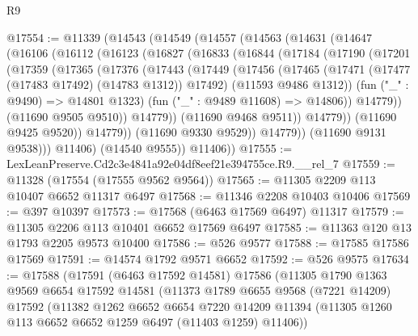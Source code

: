 \begin{lexlean}{R9}
\begin{coremodule}
@17554 := @11339
    (@14543
      (@14549
        (@14557
          (@14563
            (@14631
              (@14647
                (@16106
                  (@16112
                    (@16123
                      (@16827
                        (@16833
                          (@16844
                            (@17184
                              (@17190
                                (@17201
                                  (@17359
                                    (@17365
                                      (@17376
                                        (@17443
                                          (@17449
                                            (@17456
                                              (@17465
                                                (@17471
                                                  (@17477 (@17483 @17492) (@14783 @1312))
                                                  @17492)
                                                (@11593 @9486 @1312))
                                              (fun ("_" : @9490) => @14801 @1323)
                                              (fun ("_" : @9489 @11608) => @14806))
                                            @14779))
                                        (@11690 @9505 @9510))
                                      @14779))
                                  (@11690 @9468 @9511))
                                @14779))
                            (@11690 @9425 @9520))
                          @14779))
                      (@11690 @9330 @9529))
                    @14779))
                (@11690 @9131 @9538)))
            @11406)
          (@14540 @9555))
        @11406))
@17555 := LexLeanPreserve.Cd2c3e4841a92e04df8eef21e394755ce.R9.__rel_7
@17559 := @11328 (@17554 (@17555 @9562 @9564))
@17565 := @11305 @2209 @113 @10407 @6652 @11317 @6497
@17568 := @11346 @2208 @10403 @10406
@17569 := @397 @10397
@17573 := @17568 (@6463 @17569 @6497) @11317
@17579 := @11305 @2206 @113 @10401 @6652 @17569 @6497
@17585 := @11363 @120 @13 @1793 @2205 @9573 @10400
@17586 := @526 @9577
@17588 := @17585 @17586 @17569
@17591 := @14574 @1792 @9571 @6652
@17592 := @526 @9575
@17634 := @17588
    (@17591
      (@6463 @17592 @14581)
      @17586
      (@11305
        @1790
        @1363
        @9569
        @6654
        @17592
        @14581
        (@11373
          @1789
          @6655
          @9568
          (@7221 @14209)
          @17592
          (@11382
            @1262
            @6652
            @6654
            @7220
            @14209
            @11394
            (@11305 @1260 @113 @6652 @6652 @1259 @6497 (@11403 @1259) @11406))

\end{coremodule}
\end{lexlean}
